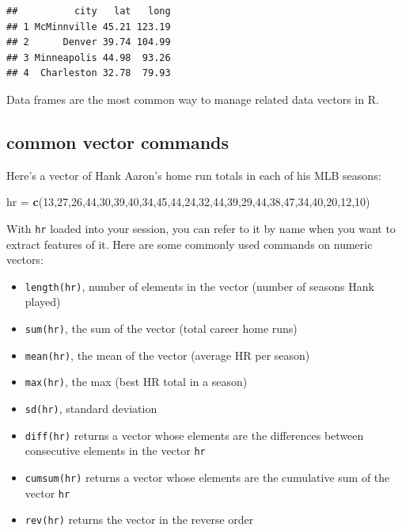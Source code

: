 \documentclass[
]{book}
\newenvironment{Shaded}{\begin{snugshade}}{\end{snugshade}}
\newcommand{\DecValTok}[1]{\textcolor[rgb]{0.00,0.00,0.81}{#1}}
\newcommand{\FunctionTok}[1]{\textcolor[rgb]{0.13,0.29,0.53}{\textbf{#1}}}
\newcommand{\NormalTok}[1]{#1}
\newcommand{\OtherTok}[1]{\textcolor[rgb]{0.56,0.35,0.01}{#1}}
\providecommand{\tightlist}{%
  \setlength{\itemsep}{0pt}\setlength{\parskip}{0pt}}
\theoremstyle{definition}
\theoremstyle{definition}
\theoremstyle{definition}
\theoremstyle{definition}
\theoremstyle{remark}
\begin{document}
\begin{verbatim}
##          city   lat   long
## 1 McMinnville 45.21 123.19
## 2      Denver 39.74 104.99
## 3 Minneapolis 44.98  93.26
## 4  Charleston 32.78  79.93
\end{verbatim}

Data frames are the most common way to manage related data vectors in R.

\subsection*{common vector commands}\label{common-vector-commands}

Here's a vector of Hank Aaron's home run totals in each of his MLB seasons:

\begin{Shaded}
\begin{Highlighting}[]
\NormalTok{hr }\OtherTok{=} \FunctionTok{c}\NormalTok{(}\DecValTok{13}\NormalTok{,}\DecValTok{27}\NormalTok{,}\DecValTok{26}\NormalTok{,}\DecValTok{44}\NormalTok{,}\DecValTok{30}\NormalTok{,}\DecValTok{39}\NormalTok{,}\DecValTok{40}\NormalTok{,}\DecValTok{34}\NormalTok{,}\DecValTok{45}\NormalTok{,}\DecValTok{44}\NormalTok{,}\DecValTok{24}\NormalTok{,}\DecValTok{32}\NormalTok{,}\DecValTok{44}\NormalTok{,}\DecValTok{39}\NormalTok{,}\DecValTok{29}\NormalTok{,}\DecValTok{44}\NormalTok{,}\DecValTok{38}\NormalTok{,}\DecValTok{47}\NormalTok{,}\DecValTok{34}\NormalTok{,}\DecValTok{40}\NormalTok{,}\DecValTok{20}\NormalTok{,}\DecValTok{12}\NormalTok{,}\DecValTok{10}\NormalTok{)}
\end{Highlighting}
\end{Shaded}

With \texttt{hr} loaded into your session, you can refer to it by name when you want to extract features of it. Here are some commonly used commands on numeric vectors:

\begin{itemize}
\tightlist
\item
  \texttt{length(hr)}, number of elements in the vector (number of seasons Hank played)
\item
  \texttt{sum(hr)}, the sum of the vector (total career home runs)
\item
  \texttt{mean(hr)}, the mean of the vector (average HR per season)
\item
  \texttt{max(hr)}, the max (best HR total in a season)
\item
  \texttt{sd(hr)}, standard deviation
\item
  \texttt{diff(hr)} returns a vector whose elements are the differences between consecutive elements in the vector \texttt{hr}
\item
  \texttt{cumsum(hr)} returns a vector whose elements are the cumulative sum of the vector \texttt{hr}
\item
  \texttt{rev(hr)} returns the vector in the reverse order
\end{itemize}
\end{document}
